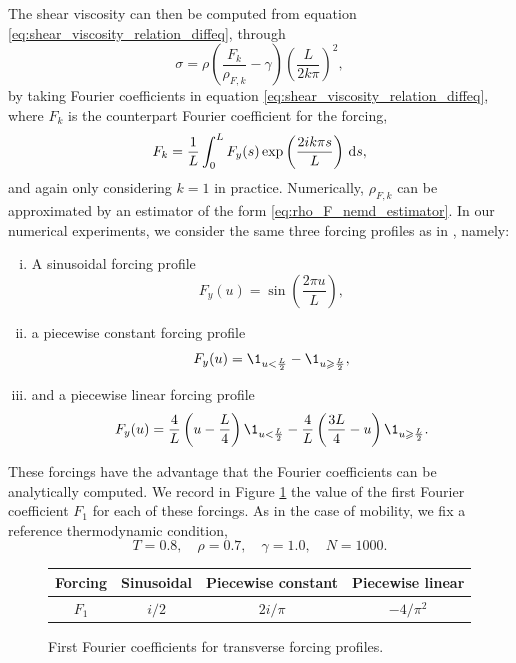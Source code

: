 The shear viscosity can then be computed from equation \eqref{eq:shear_viscosity_relation_diffeq}, through
\begin{equation}
    \label{eq:shear_viscosity_nemd_estimator}
    \sigma=\rho\left(\frac{F_k}{\rho_{F,k}}-\gamma\right)\left(\frac{L}{2k\pi}\right)^2,
\end{equation}
by taking Fourier coefficients in equation \eqref{eq:shear_viscosity_relation_diffeq},
where $F_k$ is the counterpart Fourier coefficient for the forcing,
\[F_k=\frac 1L\int_0^L F_y(s)\exp\left(\frac{2ik\pi s}L\right)\,\mathrm{d} s,\]
and again only considering $k=1$ in practice. Numerically, $\rho_{F,k}$ can be approximated by an estimator of the form \eqref{eq:rho_F_nemd_estimator}.
In our numerical experiments, we consider the same three forcing profiles as in \cite{JS12}, namely:
\begin{enumerate}[(i)]
    \item A sinusoidal forcing profile \[F_y(u)=\sin\left(\frac{2\pi u}{L}\right),\]
    \item a piecewise constant forcing profile \[F_y(u)=\1_{u<\frac{L}2}-\1_{u\geq \frac{L}2},\]
    \item and a piecewise linear forcing profile \[F_y(u)=\frac{4}{L}\left(u-\frac{L}4\right)\1_{u<\frac{L}2}-\frac{4}L\left(\frac{3L}4-u\right)\1_{u\geq \frac{L}2}.\]
\end{enumerate}
These forcings have the advantage that the Fourier coefficients can be analytically computed. We record in Figure \ref{tab:fourier_coefficients} the value of the first Fourier coefficient $F_1$ for each of these forcings.
As in the case of mobility, we fix a reference thermodynamic condition,
\begin{equation}
    \label{eq:reference_thermo_condition_sv}
    T=0.8,\quad \rho=0.7,\quad \gamma=1.0,\quad N=1000.
\end{equation}

\begin{figure}
    \begin{center}
        \begin{tabular}{ |c|c|c|c| }\hline
            Forcing & Sinusoidal & Piecewise constant & Piecewise linear \\
            \hline
            $F_1$ & $i/2$ & $2i/\pi$ & $-4/\pi^2$ \\
            \hline 
        \end{tabular}
        \caption{ \label{tab:fourier_coefficients}
            First Fourier coefficients for transverse forcing profiles.
          }
    \end{center}
\end{figure}

